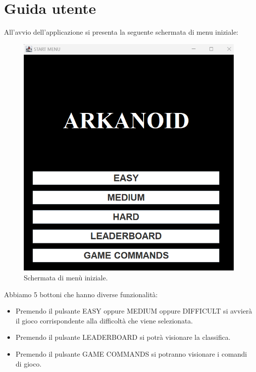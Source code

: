 \documentclass[a4paper,12pt]{report}
\begin{document}
\section{Guida utente}
All'avvio dell'applicazione si presenta la seguente schermata di menu iniziale:
\begin{figure}[H]
    \centering{}
    \includegraphics[scale=0.4]{images/StartMenuGuidaUtente.png}
    \caption{Schermata di menù iniziale.}
    \label{images:StartMenuGuidaUtente}
\end{figure}
Abbiamo 5 bottoni che hanno diverse funzionalità:
\begin{itemize}
    \item Premendo il pulsante EASY oppure MEDIUM oppure DIFFICULT si avvierà il gioco corrispondente alla difficoltà che viene selezionata.
    \item Premendo il pulsante LEADERBOARD si potrà visionare la classifica.
    \item Premendo il pulsante GAME COMMANDS si potranno visionare i comandi di gioco.
\end{itemize}
\end{document}
